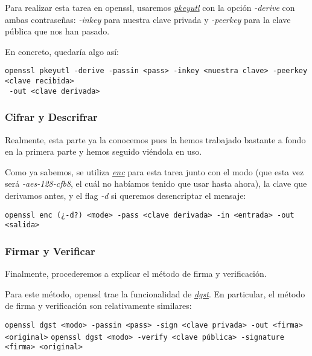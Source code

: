 \documentclass[a4paper, 11pt]{article}
\begin{document}
			Para realizar esta tarea en openssl, usaremos \href{https://www.openssl.org/docs/man1.0.2/apps/pkeyutl.html}
			{\textit{pkeyutl}} con la opción \textit{-derive} con ambas contraseñas: \textit{-inkey} para nuestra clave privada
			y \textit{-peerkey} para la clave pública que nos han pasado.
			
			En concreto, quedaría algo así:\\
			\begin{small}
				\verb|openssl pkeyutl -derive -passin <pass> -inkey <nuestra clave> -peerkey <clave recibida>| \\
				\verb| -out <clave derivada>|
			\end{small}
				
		\subsubsection{Cifrar y Descrifrar}
			Realmente, esta parte ya la conocemos pues la hemos trabajado bastante a fondo en la primera parte y hemos seguido
			viéndola en uso.
			
			Como ya sabemos, se utiliza \href{https://www.openssl.org/docs/man1.0.2/apps/enc.html}{\textit{enc}} para esta
			tarea junto con el modo (que esta vez será \textit{-aes-128-cfb8}, el cuál no habíamos tenido que usar hasta
			ahora), la clave que derivamos antes, y el flag \textit{-d} si queremos desencriptar el mensaje:
			
			\begin{small}
				\verb|openssl enc (¿-d?) <mode> -pass <clave derivada> -in <entrada> -out <salida>|
			\end{small}
		
		\subsubsection{Firmar y Verificar}		
			Finalmente, procederemos a explicar el método de firma y verificación.
			
			Para este método, openssl trae la funcionalidad de \href{https://www.openssl.org/docs/man1.0.2/apps/dgst.html}
			{\textit{dgst}}. En particular, el método de firma y verificación son relativamente similares:

			\begin{small}
				\verb|openssl dgst <modo> -passin <pass> -sign <clave privada> -out <firma> <original>|
				\verb|openssl dgst <modo> -verify <clave pública> -signature <firma> <original>|
			\end{small}
			
\end{document}
